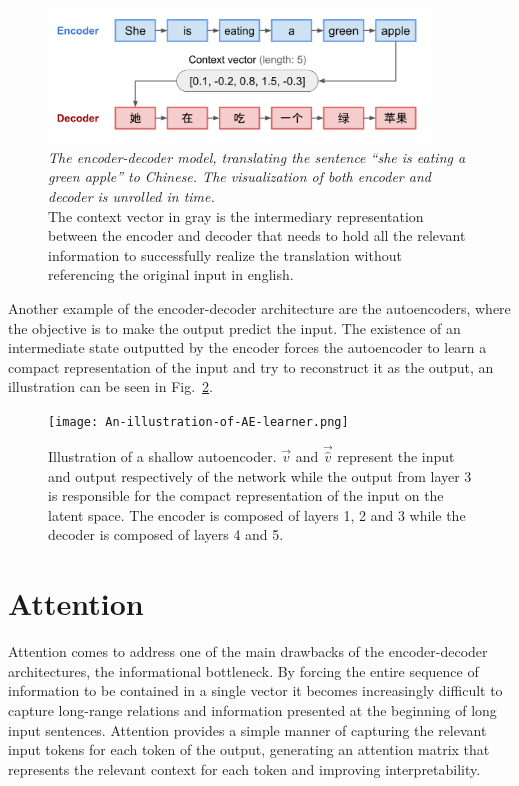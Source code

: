 \begin{figure}[!ht]
\centering
\includegraphics[width=0.9\textwidth]{figuras/context_vector.png}
\caption{\textit{The encoder-decoder model, translating the sentence ``she is eating a green apple'' to Chinese. The visualization of both encoder and decoder is unrolled in time.} \citep{weng2018attention}\\ The context vector in gray is the intermediary representation between the encoder and decoder that needs to hold all the relevant information to successfully realize the translation without referencing the original input in english. }
\label{contextvec}
\end{figure}


Another example of the encoder-decoder architecture are the autoencoders, where the objective is to make the output predict the input. The existence of an intermediate state outputted by the encoder forces the autoencoder to learn a compact representation of the input and try to reconstruct it as the output, an illustration can be seen in Fig.~\ref{autoencoder}.


\begin{figure}[!ht]
\centering
\texttt{[image: An-illustration-of-AE-learner.png]}
\caption{Illustration \citep{imagem_autoencoder} of a shallow autoencoder. $\vec{v}$ and $\vec{\hat{v}}$ represent the input and output respectively of the network while the output from layer 3 is responsible for the compact representation of the input on the latent space. The encoder is composed of layers 1, 2 and 3 while the decoder is composed of layers 4 and 5.}
\label{autoencoder}
\end{figure}

\section{Attention}
Attention comes to address one of the main drawbacks of the encoder-decoder architectures, the informational bottleneck. By forcing the entire sequence of information to be contained in a single vector it becomes increasingly difficult to capture long-range relations and information presented at the beginning of long input sentences. 
Attention provides a simple manner of capturing the relevant input tokens for each token of the output, generating an attention matrix that represents the relevant context for each token and improving interpretability.



